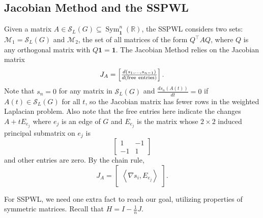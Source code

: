 \documentclass{article}
\theoremstyle{definition}
\newcommand{\trans}{^\top}
\newcommand{\inp}[2]{\left\langle#1,#2\right\rangle}
\newcommand{\bone}{\mathbf{1}}
\newcommand{\msymz}[1][n]{\operatorname{Sym}_{\bone}^{#1}(\mathbb{R})}
\newcommand{\mptn}{\mathcal{S}}
\begin{document}
\subsection{Jacobian Method and the SSPWL}

Given a matrix $A\in\mptn_L(G)\subseteq\msymz$, the SSPWL considers two sets:  $\mathcal{M}_1 = \mptn_L(G)$ and  $\mathcal{M}_2$,  the set of all matrices of the form $Q\trans AQ$, where $Q$ is any orthogonal matrix with $Q\bone = \bone$.  The Jacobian Method relies on the Jacobian matrix 
\[
    J_A = \begin{bmatrix}
        \frac{d(s_1,\ldots, s_{n-1})}{d({\rm free\ entries})}
    \end{bmatrix}.
\]
Note that $s_n = 0$ for any matrix in $\mptn_L(G)$ and $\frac{d s_n(A(t))}{dt} = 0$ if $A(t)\in\mptn_L(G)$ for all $t$, so the Jacobian matrix has fewer rows in the weighted Laplacian problem.  Also note that the free entries here indicate the changes $A + tE_{e_j}$ where $e_j$ is an edge of $G$ and $E_{e_j}$ is the matrix whose $2\times 2$ induced principal submatrix on $e_j$ is 
\[
    \begin{bmatrix}
        1 & -1 \\
        -1 & 1
    \end{bmatrix}
\]
and other entries are zero.  By the chain rule, 
\[
    J_A = \begin{bmatrix}
        \inp{\nabla s_i}{E_{e_j}}
    \end{bmatrix}.
\]

For SSPWL, we need one extra fact to reach our goal, utilizing properties of symmetric matrices.  Recall that $H = I - \frac{1}{n}J$.  
\end{document}
